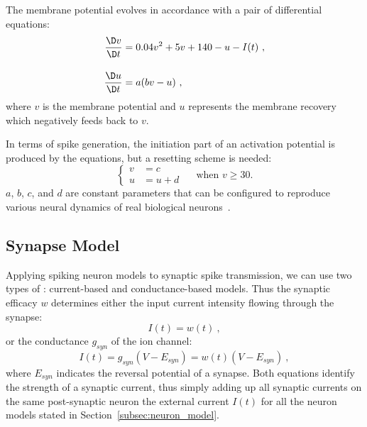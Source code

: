 The membrane potential evolves in accordance with a pair of differential equations:
\begin{equation}
\begin{aligned}
\dfrac{\D v}{\D t} &= 0.04v^2 + 5v + 140 - u - I(t)~,\\[10pt]
\dfrac{\D u}{\D t} &= a(bv - u)~,
\end{aligned}
\end{equation}
where $v$ is the membrane potential and $u$ represents the membrane recovery which negatively feeds back to $v$.
\DIFaddbegin 

\DIFaddend In terms of spike generation, the initiation part of an activation potential is produced by the equations, but a resetting scheme is needed:
\begin{equation}
\left\{
\begin{aligned}
v &= c \\
u &= u + d
\end{aligned}
\right.
\textrm{~~~~when~} v \geq 30.
\end{equation}  
$a$, $b$, $c$, and $d$ are constant parameters that can be configured to reproduce various neural dynamics of real biological neurons~\citep{izhikevich2004model}.

\subsection{Synapse Model}
Applying spiking neuron models to synaptic spike transmission, we can use two types of \DIFdelbegin {}\DIFdelend \DIFaddbegin {}\DIFaddend : current-based and conductance-based models.
Thus the synaptic efficacy $w$ determines either the input current intensity flowing through the synapse: %
\begin{equation}
I(t) = w(t)~,
\end{equation}
or the \DIFdelbegin {}\DIFdelend \DIFaddbegin {}\DIFaddend conductance $g_{syn}$ of the ion channel: %
\begin{equation}
I(t) = g_{syn} (V-E_{syn}) = w(t) (V-E_{syn})~,
\end{equation}
where $E_{syn}$ indicates the reversal potential of a synapse.
Both equations identify the strength of a synaptic current, thus simply adding up all synaptic currents on the same post-synaptic neuron \DIFdelbegin {}\DIFdelend \DIFaddbegin {}\DIFaddend the external current $I(t)$ for all the neuron models stated in Section~\ref{subsec:neuron_model}.

